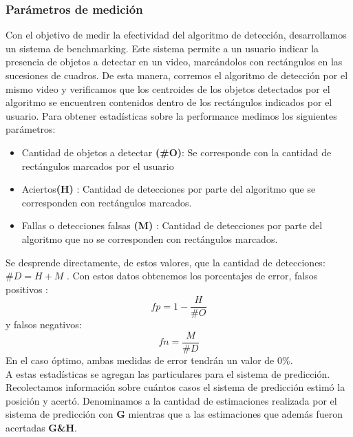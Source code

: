 \subsubsection{Par\'ametros de medici\'on}
Con el objetivo de  medir la efectividad del algoritmo de detecci\'on, desarrollamos un sistema de benchmarking. Este sistema permite
a un usuario indicar la presencia de objetos a detectar en un video, marc\'andolos con rect\'angulos en las sucesiones de cuadros. De esta
manera, corremos el algoritmo de detecci\'on por el mismo video y verificamos que los centroides de los objetos detectados por el algoritmo 
se encuentren contenidos dentro de los rect\'angulos indicados por el 
usuario. Para obtener estad\'isticas sobre la performance  
medimos los siguientes par\'ametros:
\begin{itemize}
\item { Cantidad de objetos a detectar \textbf{(\#O)}: Se corresponde con la cantidad de rect\'angulos marcados por el usuario}
\item { Aciertos\textbf{(H)} : Cantidad de detecciones por parte del algoritmo que se corresponden con rect\'angulos marcados.}
\item { Fallas o detecciones falsas \textbf{(M)} : Cantidad de detecciones por parte del algoritmo que no se corresponden con rect\'angulos marcados.}
\end{itemize}
Se desprende directamente, de estos valores, que la cantidad de detecciones: 
\textbf{$\#D=H+M$} .
Con estos datos obtenemos los porcentajes de error, falsos positivos : 
\[
	fp=1 - \frac{H}{\# O}
\]
y falsos negativos:
\[
	fn=\frac{M}{\# D}
\]
En el caso \'optimo, ambas medidas de error tendr\'an un valor de $0\%$.  \\
\indent A estas estad\'isticas se agregan las particulares para el sistema de predicci\'on. Recolectamos informaci\'on sobre
cu\'antos casos el sistema de predicci\'on estim\'o la posici\'on y acert\'o. Denominamos
a la cantidad de estimaciones realizada por el sistema de predicci\'on 
con \textbf{G} mientras que a las estimaciones que adem\'as fueron 
acertadas \textbf{G\&H}.

